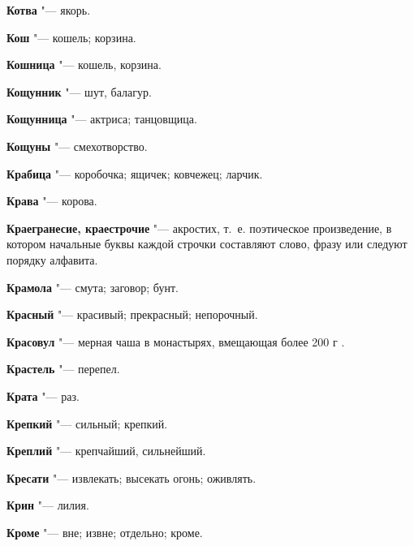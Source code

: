 \begin{mymulticols}{2}
\noindent\textbf{Котва} "--- якорь. 




\noindent\textbf{Кош} "--- кошель; корзина. 




\noindent\textbf{Кошница} "--- кошель, корзина. 




\noindent\textbf{Кощунник} "--- шут, балагур. 




\noindent\textbf{Кощунница} "--- актриса; танцовщица. 




\noindent\textbf{Кощуны} "--- смехотворство. 




\noindent\textbf{Крабица} "--- коробочка; ящичек; ковчежец; ларчик. 




\noindent\textbf{Крава} "--- корова. 




\noindent\textbf{Краегранесие, краестрочие} "--- акростих, т.~е. поэтическое произведение, в котором начальные буквы каждой строчки составляют слово, фразу или следуют порядку алфавита. 




\noindent\textbf{Крамола} "--- смута; заговор; бунт. 




\noindent\textbf{Красный} "--- красивый; прекрасный; непорочный. 




\noindent\textbf{Красовул} "--- мерная чаша в монастырях, вмещающая более 200 г . 




\noindent\textbf{Крастель} "--- перепел. 




\noindent\textbf{Крата} "--- раз. 




\noindent\textbf{Крепкий} "--- сильный; крепкий. 




\noindent\textbf{Креплий} "--- крепчайший, сильнейший. 




\noindent\textbf{Кресати} "--- извлекать; высекать огонь; оживлять. 




\noindent\textbf{Крин} "--- лилия. 




\noindent\textbf{Кроме} "--- вне; извне; отдельно; кроме. 





\end{mymulticols}
